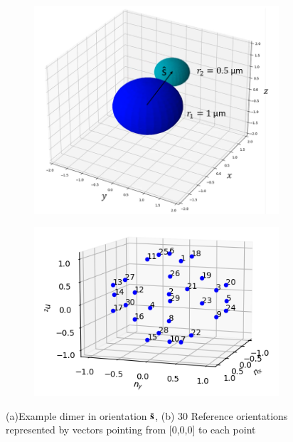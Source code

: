 \documentclass[preprint,  3p]{elsarticle}
\begin{document}
\begin{figure}[h]
	\centering
	\begin{subfigure}{0.49\textwidth}
		\subcaption{}
		\includegraphics[width=\textwidth]{./Images/fig2a.png}
	\end{subfigure}
	\begin{subfigure}{0.49\textwidth}
		\subcaption{}
		\includegraphics[width=\textwidth]{./Images/fig2b.png}
	\end{subfigure}
	\caption{(a)Example dimer in orientation $\bar{\bf s}$, (b) 30 Reference orientations represented by vectors pointing from [0,0,0] to each point}
	\label{fig:dimer}
\end{figure}
\end{document}
